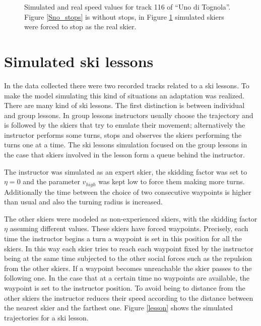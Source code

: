 \documentclass[12pt,a4paper,twoside]{book}
\begin{document}
\begin{figure}[!h]
\begin{subfigure}[b]{0.5\textwidth}
                \caption{}
                \label{Sstops}
        \end{subfigure}
        \caption{Simulated and real speed values for track 116 of ``Uno di Tognola''. Figure \ref{Sno_stops} is without stops, in Figure \ref{Sstops} simulated skiers were forced to stop as the real skier.}\label{sm_stops_track116}
\end{figure}

\section{Simulated ski lessons}
In the data collected there were two recorded tracks related to a ski lessons. To make the model simulating this kind of situations an adaptation was realized. There are many kind of ski lessons. The first distinction is between individual and group lessons. In group lessons instructors usually choose the trajectory and is followed by the skiers that try to emulate their movement; alternatively the instructor performs some turns, stops and observes the skiers performing the turns one at a time. The ski lessons simulation focused on the group lessons in the case that skiers involved in the lesson form a queue behind the instructor.

The instructor was simulated as an expert skier, the skidding factor was set to $\eta=0$ and the parameter ${v_{high}}$ was kept low to force them making more turns. Additionally the time between the choice of two consecutive waypoints is higher than usual and also the turning radius is increased.

The other skiers were modeled as non-experienced skiers, with the skidding factor $\eta$ assuming different values. These skiers have forced waypoints. Precisely, each time the instructor begins a turn a waypoint is set in this position for all the skiers. In this way each skier tries to reach each waypoint fixed by the instructor being at the same time subjected to the other social forces such as the repulsion from the other skiers. If a waypoint becomes unreachable the skier passes to the following one. In the case that at a certain time no waypoints are available, the waypoint is set to the instructor position. To avoid being to distance from the other skiers the instructor reduces their speed according to the distance between the nearest skier and the farthest one. Figure \ref{lesson} shows the simulated trajectories for a ski lesson.
\end{document}

